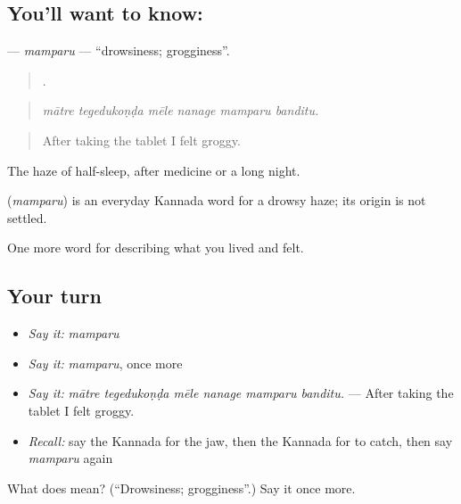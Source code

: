 \subsection*{You'll want to know: }
\textbf{} — \emph{mamparu} — \textquotedblleft{}drowsiness; grogginess\textquotedblright{}.

\begin{quote}
     .
\end{quote}

\begin{quote}
\emph{mātre tegedukoṇḍa mēle nanage mamparu banditu.}
\end{quote}

\begin{quote}
After taking the tablet I felt groggy.
\end{quote}

The haze of half-sleep, after medicine or a long night.

\begin{cousinweb}
\textbf{} (\emph{mamparu}) is an everyday Kannada word for a drowsy haze; its origin is not settled.
\end{cousinweb}

\begin{grammarlens}[title={What you've built}]
One more word for describing what you lived and felt.
\end{grammarlens}

\subsection*{Your turn}
\begin{itemize}
\raggedright
  \item \emph{Say it:} \emph{mamparu}
  \item \emph{Say it:} \emph{mamparu}, once more
  \item \emph{Say it:} \emph{mātre tegedukoṇḍa mēle nanage mamparu banditu.} — After taking the tablet I felt groggy.
  \item \emph{Recall:} say the Kannada for the jaw, then the Kannada for to catch, then say \emph{mamparu} again
\end{itemize}

\begin{tcolorbox}[breakable,colback=teal!4,colframe=teal!35!black,title={Before you move on}]
What does  mean? (\textquotedblleft{}Drowsiness; grogginess\textquotedblright{}.) Say it once more.
\end{tcolorbox}
